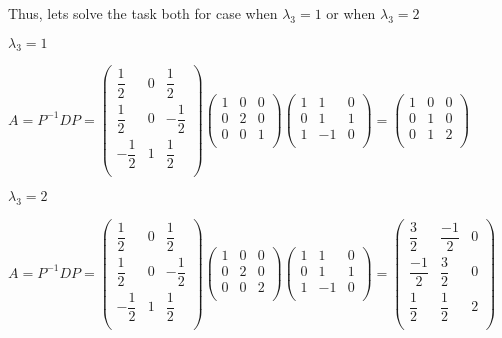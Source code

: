 \documentclass[12pt,letterpaper]{article}
\begin{document}
\begin{enumerate}[label=(\alph*)]
        Thus, lets solve the task both for case when $\lambda_3 = 1$ or when $\lambda_3 = 2$
        
        $\lambda_3 = 1$
        
        $A = P^{-1}DP = \begin{pmatrix}
            \dfrac{1}{2} & 0 & \dfrac{1}{2} \\
            \dfrac{1}{2} & 0 & -\dfrac{1}{2} \\
            -\dfrac{1}{2} & 1 & \dfrac{1}{2} \\
        \end{pmatrix}\begin{pmatrix}
            1 & 0 & 0 \\
            0 & 2 & 0 \\
            0 & 0 & 1 \\
        \end{pmatrix}\begin{pmatrix}
            1 & 1 & 0 \\
            0 & 1 & 1 \\
            1 & -1 & 0 \\
        \end{pmatrix} = \begin{pmatrix}
            1 & 0 & 0 \\
            0 & 1 & 0 \\
            0 & 1 & 2 \\
        \end{pmatrix}$
        
        $\lambda_3 = 2$
        
        $A = P^{-1}DP = \begin{pmatrix}
            \dfrac{1}{2} & 0 & \dfrac{1}{2} \\
            \dfrac{1}{2} & 0 & -\dfrac{1}{2} \\
            -\dfrac{1}{2} & 1 & \dfrac{1}{2} \\
        \end{pmatrix}\begin{pmatrix}
            1 & 0 & 0 \\
            0 & 2 & 0 \\
            0 & 0 & 2 \\
        \end{pmatrix}\begin{pmatrix}
            1 & 1 & 0 \\
            0 & 1 & 1 \\
            1 & -1 & 0 \\
        \end{pmatrix} = \begin{pmatrix}
            \dfrac{3}{2} & \dfrac{-1}{2} & 0 \\
            \dfrac{-1}{2} & \dfrac{3}{2} & 0 \\
            \dfrac{1}{2} & \dfrac{1}{2} & 2 \\
        \end{pmatrix}$
    \end{enumerate}
    
\end{document}
